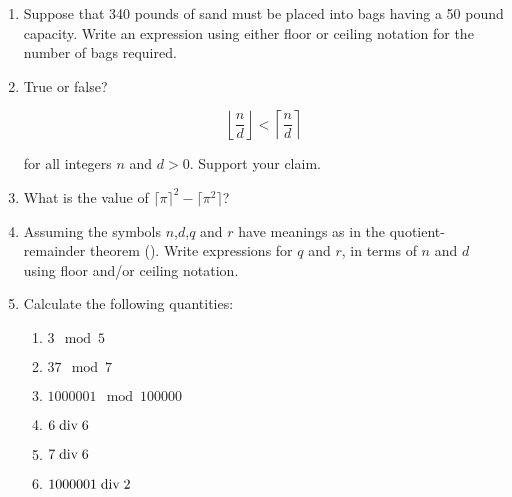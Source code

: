 \begin{enumerate}
\item Suppose that 340 pounds of sand must be placed into bags having
  a 50 pound capacity.  Write an expression using either floor or
  ceiling notation for the number of bags required.

\wbvfill


\textbookpagebreak

\item True or false? 

\[ \left\lfloor \frac{n}{d}\right\rfloor < \left\lceil \frac{n}{d}\right\rceil \]
 
\noindent for all integers $n$ and $d>0$. Support your claim.

\wbvfill


\workbookpagebreak

\item What is the value of $\lceil\pi\rceil^{2}-\lceil\pi^{2}\rceil$?

\wbvfill




\item Assuming the symbols $n$,$d$,$q$ and $r$ have meanings as in the
  quotient-remainder theorem ().  Write
  expressions for $q$ and $r$, in terms of $n$ and $d$ using floor
  and/or ceiling notation.

\wbvfill


\hintspagebreak

\item Calculate the following quantities:

\begin{enumerate}
\item \wbitemsep $3 \mod 5$
\item \wbitemsep $37 \mod 7$
\item \wbitemsep $1000001 \mod 100000$
\item \wbitemsep $6 \; \mbox{div} \; 6$
\item \wbitemsep $7 \; \mbox{div} \; 6$
\item \wbitemsep $1000001 \; \mbox{div} \; 2$
\end{enumerate}


\end{enumerate}
